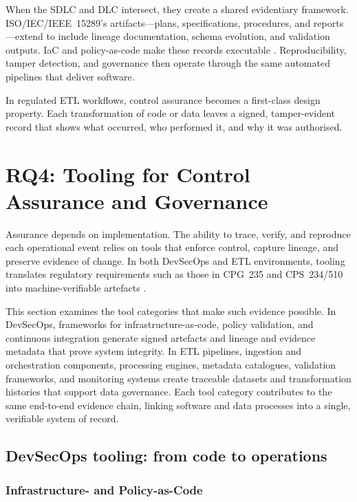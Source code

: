 When the SDLC and DLC intersect, they create a shared evidentiary framework.
ISO/IEC/IEEE~15289’s artifacts—plans, specifications, procedures, and
reports—extend to include lineage documentation, schema evolution, and
validation outputs. IaC and policy-as-code make these records executable
\cite{anisetti_semi-automatic_2020, myrbakken_devsecops_2017,
elbaghazaoui_integrating_2025-1}. Reproducibility, tamper detection, and
governance then operate through the same automated pipelines that deliver
software.

In regulated ETL workflows, control assurance becomes a first-class design
property. Each transformation of code or data leaves a signed, tamper-evident
record that shows what occurred, who performed it, and why it was authorised.

\section{RQ4: Tooling for Control Assurance and Governance}

Assurance depends on implementation. The ability to trace, verify, and
reproduce each operational event relies on tools that enforce control, capture
lineage, and preserve evidence of change. In both DevSecOps and ETL
environments, tooling translates regulatory requirements such as those in
CPG~235 and CPS~234/510 into machine-verifiable artefacts
\cite{australian_prudential_regulation_authority_prudential_2013, cps234,
cps510}.  

This section examines the tool categories that make such evidence possible. In
DevSecOps, frameworks for infrastructure-as-code, policy validation, and
continuous integration generate signed artefacts and lineage and evidence
metadata that prove system integrity. In ETL pipelines, ingestion and
orchestration components, processing engines, metadata catalogues, validation
frameworks, and monitoring systems create traceable datasets and transformation
histories that support data governance. Each tool category contributes to the
same end-to-end evidence chain, linking software and data processes into a
single, verifiable system of record.

\subsection*{DevSecOps tooling: from code to operations}

\subsubsection*{Infrastructure- and Policy-as-Code}

